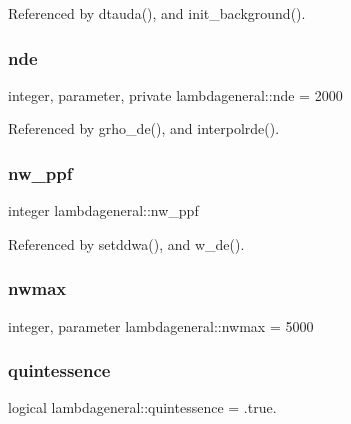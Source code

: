Referenced by dtauda(), and init\+\_\+background().

\mbox{\label{namespacelambdageneral_ae21da0c8fff86159b789dee9579bd7d5}} 
\subsubsection{\texorpdfstring{nde}{nde}}
{\footnotesize\ttfamily integer, parameter, private lambdageneral\+::nde = 2000\hspace{0.3cm}{\ttfamily [private]}}



Referenced by grho\+\_\+de(), and interpolrde().

\mbox{\label{namespacelambdageneral_ab52783406de69e4d228acb0d9fefc1c6}} 
\subsubsection{\texorpdfstring{nw\+\_\+ppf}{nw\_ppf}}
{\footnotesize\ttfamily integer lambdageneral\+::nw\+\_\+ppf}



Referenced by setddwa(), and w\+\_\+de().

\mbox{\label{namespacelambdageneral_a72ab4fcacd74a66fe577794d5294864b}} 
\subsubsection{\texorpdfstring{nwmax}{nwmax}}
{\footnotesize\ttfamily integer, parameter lambdageneral\+::nwmax = 5000}

\mbox{\label{namespacelambdageneral_a089643a9b64fa595564ae2a20a525c0a}} 
\subsubsection{\texorpdfstring{quintessence}{quintessence}}
{\footnotesize\ttfamily logical lambdageneral\+::quintessence = .true.}



